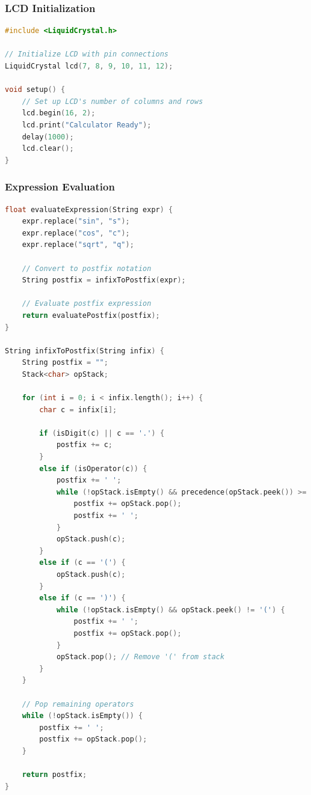 \documentclass{article}
\begin{document}
\subsubsection{LCD Initialization}
\begin{lstlisting}[language=C++]
#include <LiquidCrystal.h>

// Initialize LCD with pin connections
LiquidCrystal lcd(7, 8, 9, 10, 11, 12);

void setup() {
    // Set up LCD's number of columns and rows
    lcd.begin(16, 2);
    lcd.print("Calculator Ready");
    delay(1000);
    lcd.clear();
}
\end{lstlisting}

\subsubsection{Expression Evaluation}
\begin{lstlisting}[language=C++]
float evaluateExpression(String expr) {
    expr.replace("sin", "s");
    expr.replace("cos", "c");
    expr.replace("sqrt", "q");
    
    // Convert to postfix notation
    String postfix = infixToPostfix(expr);
    
    // Evaluate postfix expression
    return evaluatePostfix(postfix);
}

String infixToPostfix(String infix) {
    String postfix = "";
    Stack<char> opStack;
    
    for (int i = 0; i < infix.length(); i++) {
        char c = infix[i];
        
        if (isDigit(c) || c == '.') {
            postfix += c;
        }
        else if (isOperator(c)) {
            postfix += ' ';
            while (!opStack.isEmpty() && precedence(opStack.peek()) >= precedence(c)) {
                postfix += opStack.pop();
                postfix += ' ';
            }
            opStack.push(c);
        }
        else if (c == '(') {
            opStack.push(c);
        }
        else if (c == ')') {
            while (!opStack.isEmpty() && opStack.peek() != '(') {
                postfix += ' ';
                postfix += opStack.pop();
            }
            opStack.pop(); // Remove '(' from stack
        }
    }
    
    // Pop remaining operators
    while (!opStack.isEmpty()) {
        postfix += ' ';
        postfix += opStack.pop();
    }
    
    return postfix;
}
\end{lstlisting}
\end{document}
